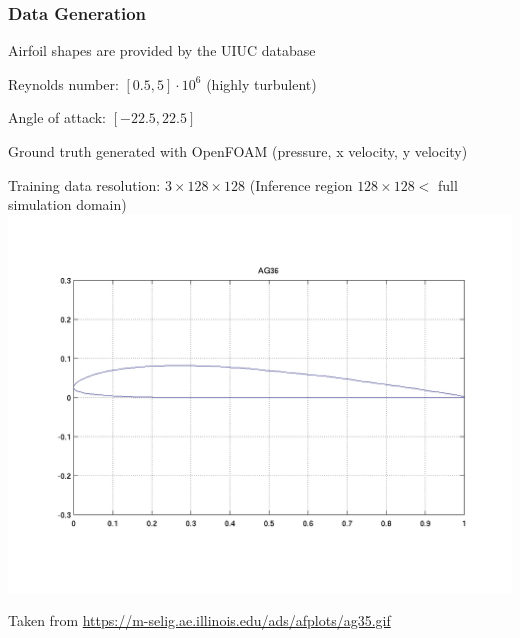 
\begin{frame}
    \frametitle{Data Generation}

\vspace*{1cm}
\begin{multicols}{2}
    Airfoil shapes are provided by the UIUC database

    Reynolds number: $[0.5, 5] \cdot 10^6$ (highly turbulent)

    Angle of attack: $[-22.5, 22.5]$

    Ground truth generated with OpenFOAM \newline (pressure, x velocity, y velocity)
    
    Training data resolution: $3\times 128 \times 128$ \newline
    (Inference region $128 \times 128 <$ full simulation domain)
    \vfill\columnbreak
    \includegraphics[width=\columnwidth, height=.6\textheight]{./Ressourcen/Praesentation/Bilder/uiuc_sample.png}
    
\end{multicols}
	\vspace*{-1.4cm}
    Taken from \url{https://m-selig.ae.illinois.edu/ads/afplots/ag35.gif}
\end{frame}
\clearpage